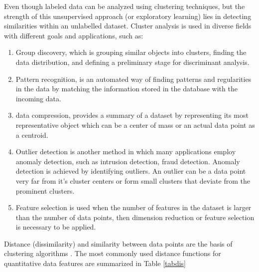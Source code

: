 \documentclass[../UNBThesis2.tex]{subfiles}
\begin{document}
Even though labeled data can be analyzed using clustering techniques, but the strength of this unsupervised approach (or exploratory learning) lies in detecting similarities within an unlabelled dataset. Cluster analysis is used in diverse fields with different goals and applications, such as: 

\begin{enumerate}
    \item Group discovery, which is grouping similar objects into clusters, finding the data distribution, and defining a preliminary stage for discriminant analysis. 
    \item Pattern recognition, is an automated way of finding patterns and regularities in the data by matching the information stored in the database with the incoming data. 
    \item data compression, provides a summary of a dataset by representing its most representative object which can be a center of mass or an actual data point as a centroid.
    \item Outlier detection is another method in which many applications employ anomaly detection, such as intrusion detection, fraud detection. Anomaly detection is achieved by identifying outliers. An outlier can be a data point very far from it's cluster centers or form small clusters that deviate from the prominent clusters.
    \item Feature selection is used when the number of features in the dataset is larger than the number of data points, then dimension reduction or feature selection is necessary to be applied.
\end{enumerate}


Distance (dissimilarity) and similarity between data points are the basis of clustering algorithms \cite{zumel2014practical}. The most commonly used distance functions for quantitative data features are summarized in Table \ref{tabdis}



\end{document}

